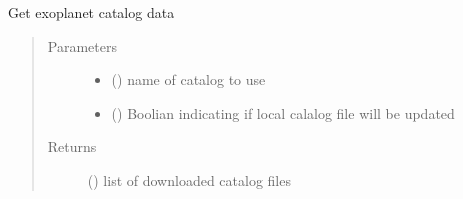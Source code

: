 \documentclass[a4paper,10pt,english]{sphinxmanual}
\begin{document}
\begin{fulllineitems}
\label{\detokenize{cascade.exoplanet_tools:cascade.exoplanet_tools.exoplanet_tools.get_calalog}}
Get exoplanet catalog data
\begin{quote}\begin{description}
\item[{Parameters}] \leavevmode\begin{itemize}
\item {} 
 () \textendash{} name of catalog to use

\item {} 
 () \textendash{} Boolian indicating if local calalog file will be updated

\end{itemize}

\item[{Returns}] \leavevmode
{} () \textendash{} list of downloaded catalog files

\end{description}\end{quote}

\end{fulllineitems}

\end{document}
